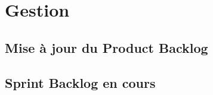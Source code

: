 \section{Gestion}

	\subsection{Mise à jour du Product Backlog}
	\lipsumC

	\subsection{Sprint Backlog en cours}
	\lipsumC